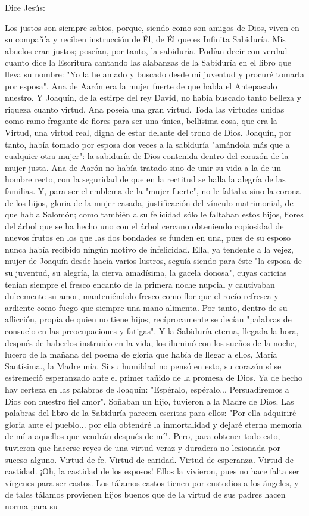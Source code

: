 \documentclass[12pt]{book} %
\begin{document}
Dice Jesús: 

Los justos son siempre sabios, porque, siendo como son amigos de Dios, viven en su compañía y reciben instrucción de Él, de Él que es Infinita Sabiduría. Mis abuelos eran justos; poseían, por tanto, la sabiduría. Podían decir con verdad cuanto dice la Escritura cantando las alabanzas de la Sabiduría en el libro que lleva su nombre: "Yo la he amado y buscado desde mi juventud y procuré tomarla por esposa". Ana de Aarón era la mujer fuerte de que habla el Antepasado nuestro. Y Joaquín, de la estirpe del rey David, no había buscado tanto belleza y riqueza cuanto virtud. Ana poseía una gran virtud. Toda las virtudes unidas como ramo fragante de flores para ser una única, bellísima cosa, que era la Virtud, una virtud real, digna de estar delante del trono de Dios. Joaquín, por tanto, había tomado por esposa dos veces a la sabiduría "amándola más que a cualquier otra mujer": la sabiduría de Dios contenida dentro del corazón de la mujer justa. Ana de Aarón no había tratado sino de unir su vida a la de un hombre recto, con la seguridad de que en la rectitud se halla la alegría de las familias. Y, para ser el emblema de la "mujer fuerte", no le faltaba sino la corona de los hijos, gloria de la mujer casada, justificación del vínculo matrimonial, de que habla Salomón; como también a su felicidad sólo le faltaban estos hijos, flores del árbol que se ha hecho uno con el árbol cercano obteniendo copiosidad de nuevos frutos en los que las dos bondades se funden en una, pues de su esposo nunca había recibido ningún motivo de infelicidad. Ella, ya tendente a la vejez, mujer de Joaquín desde hacía varios lustros, seguía siendo para éste "la esposa de su juventud, su alegría, la cierva amadísima, la gacela donosa", cuyas caricias tenían siempre el fresco encanto de la primera noche nupcial y cautivaban dulcemente su amor, manteniéndolo fresco como flor que el rocío refresca y ardiente como fuego que siempre una mano alimenta. Por tanto, dentro de su aflicción, propia de quien no tiene hijos, recíprocamente se decían "palabras de consuelo en las preocupaciones y fatigas". Y la Sabiduría eterna, llegada la hora, después de haberlos instruido en la vida, los iluminó con los sueños de la noche, lucero de la mañana del poema de gloria que había de llegar a ellos, María Santísima., la Madre mía. Si su humildad no pensó en esto, su corazón sí se estremeció esperanzado ante el primer tañido de la promesa de Dios. Ya de hecho hay certeza en las palabras de Joaquín: "Espéralo, espéralo... Persuadiremos a Dios con nuestro fiel amor". Soñaban un hijo, tuvieron a la Madre de Dios. Las palabras del libro de la Sabiduría parecen escritas para ellos: "Por ella adquiriré gloria ante el pueblo... por ella obtendré la inmortalidad y dejaré eterna memoria de mí a aquellos que vendrán después de mí". Pero, para obtener todo esto, tuvieron que hacerse reyes de una virtud veraz y duradera no lesionada por suceso alguno. Virtud de fe. Virtud de caridad. Virtud de esperanza. Virtud de castidad. ¡Oh, la castidad de los esposos! Ellos la vivieron, pues no hace falta ser vírgenes para ser castos. Los tálamos castos tienen por custodios a los ángeles, y de tales tálamos provienen hijos buenos que de la virtud de sus padres hacen norma para su 
\end{document}
